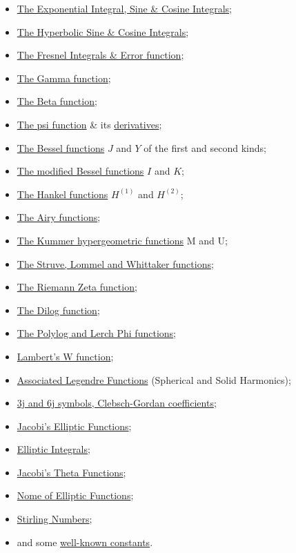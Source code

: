 \begin{itemize}
\item \hyperlink{INTEGF}{The Exponential Integral, Sine \& Cosine Integrals};
\item \hyperlink{INTEGF}{The Hyperbolic Sine \& Cosine Integrals};
\item \hyperlink{INTEGF}{The Fresnel Integrals \& Error function};
\item \hyperlink{GAMMF}{The Gamma function};
\item \hyperlink{BETAF}{The Beta function};
\item \hyperlink{DIGAM}{The psi function} \& its \hyperlink{POLYGAM}{derivatives};
\item \hyperlink{BESSELF}{The Bessel functions} $J$ and $Y$ of the first and second kinds;
\item \hyperlink{BESSELF}{The modified Bessel functions} $I$ and $K$;
\item \hyperlink{BESSELF}{The Hankel functions} $H^{(1)}$ and $H^{(2)}$;
\item \hyperlink{AIRYF}{The Airy functions};
\item \hyperlink{HYPERGEOM}{The Kummer hypergeometric functions} M and U;
\item \hyperlink{HYPERGEOM}{The Struve, Lommel and Whittaker functions};
\item \hyperlink{RIEMZETA}{The Riemann Zeta function};
\item \hyperlink{POLYLOG}{The Dilog function};
\item \hyperlink{POLYLOG}{The Polylog and Lerch Phi functions};
\item \hyperlink{LAMBERTW}{Lambert's W function};
\item \hyperlink{SPHSOLH}{Associated Legendre Functions}
(Spherical and Solid Harmonics);
\item \hyperlink{CLEBSCHG}{3j and 6j symbols, Clebsch-Gordan coefficients};
\item \hyperlink{JACEF}{Jacobi's Elliptic Functions};
\item \hyperlink{ELLIPI}{Elliptic Integrals};
\item \hyperlink{JACTF}{Jacobi's Theta Functions};
\item \hyperlink{ELLIPNOME}{Nome of Elliptic Functions};
\item \hyperlink{STIRL}{Stirling Numbers};
\item and some \hyperlink{CONSTS}{well-known constants}.
\end{itemize}

